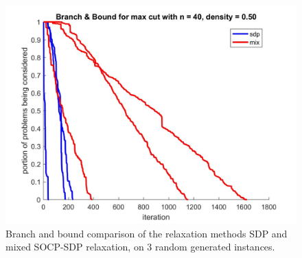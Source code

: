 \documentclass[12pt]{book}
\theoremstyle{definition}
\begin{document}
\begin{figure}
\centering
\includegraphics[scale=0.25]{img/compbnb_n40_d50_cons4.jpg}
\caption[Branch and bound comparison of the relaxation methods]{Branch and bound comparison of the relaxation methods SDP and mixed SOCP-SDP relaxation, on 3 random generated instances. }
\label{Figurebnb3}
\end{figure}
\end{document}
